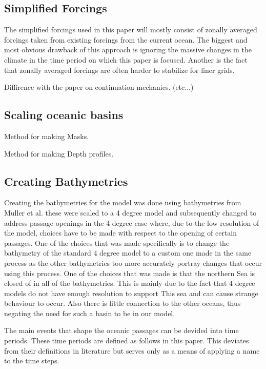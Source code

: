 \documentclass[a4paper]{article}
\begin{document}
\begin{multicols}{2}


\subsection{Simplified Forcings}
The simplified forcings used in this paper will mostly consist of zonally averaged forcings taken from existing forcings from the current ocean. The biggest and most obvious drawback of this approach is ignoring the massive changes in the climate in the time period on which this paper is focused. Another is the fact that zonally averaged forcings are often harder to stabilize for finer grids.


Diffirence with the paper on continuation mechanics. (etc...)

\subsection{Scaling oceanic basins}

Method for making Masks.

Method for making Depth profiles.


\subsection{Creating Bathymetries}
Creating the bathymetries for the model was done using bathymetries from Muller et al.\cite{Muller2008Mar} these were scaled to a 4 degree model and subsequently changed to address passage openings in the 4 degree case where, due to the low resolution of the model, choices have to be made with respect to the opening of certain passages. One of the choices that was made specifically is to change the bathymetry of the standard 4 degree model to a custom one made in the same process as the other bathymetries too more accurately portray changes that occur using this process. One of the choices that was made is that the northern Sea is closed of in all of the bathymetries. This is mainly due to the fact that 4 degree models do not have enough resolution to support This sea and can cause strange behaviour to occur. Also there is little connection to the other oceans, thus negating the need for such a basin to be in our model.

The main events that shape the oceanic passages can be devided into time periods. These time periods are defined as follows in this paper. This deviates from their definitions in literature but serves only as a means of applying a name to the time steps.


\end{multicols}
\end{document}
